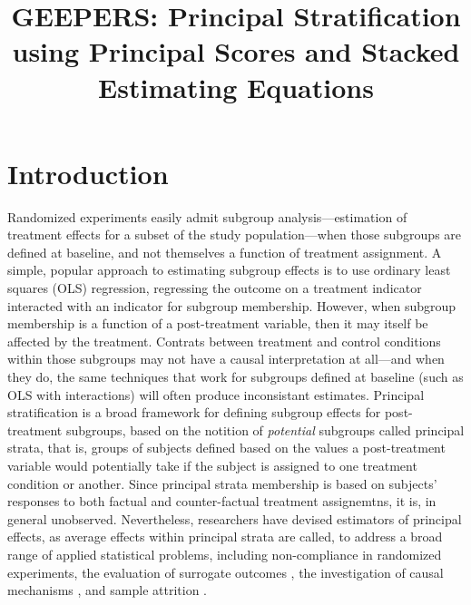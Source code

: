 \documentclass[11pt]{article} %
\title{GEEPERS: Principal Stratification using Principal Scores and Stacked Estimating Equations}
\begin{document}
\maketitle

\section{Introduction}

Randomized experiments easily admit subgroup analysis---estimation of treatment effects for a subset of the study population---when those subgroups are defined at baseline, and not themselves a function of treatment assignment.
A simple, popular approach to estimating subgroup effects is to use ordinary least squares (OLS) regression, regressing the outcome on a treatment indicator interacted with an indicator for subgroup membership.
However, when subgroup membership is a function of a post-treatment variable, then it may itself be affected by the treatment.
Contrats between treatment and control conditions within those subgroups may not have a causal interpretation at all---and when they do, the same techniques that work for subgroups defined at baseline (such as OLS with interactions) will often produce inconsistant estimates.
Principal stratification \citep{frangakis} is a broad framework for defining subgroup effects for post-treatment subgroups, based on the notition of \emph{potential} subgroups called principal strata, that is, groups of subjects defined based on the values a post-treatment variable would potentially take if the subject is assigned to one treatment condition or another.
Since principal strata membership is based on subjects' responses to both factual and counter-factual treatment assignemtns, it is, in general unobserved.
Nevertheless, researchers have devised estimators of principal effects, as average effects within principal strata are called, to address a broad range of applied statistical problems, including non-compliance in randomized experiments, the evaluation of surrogate outcomes \citep{}, the investigation of causal mechanisms \citep{lidsayPage}, and sample attrition \citep{zhouRubin, pengDing2011}.
\end{document}
